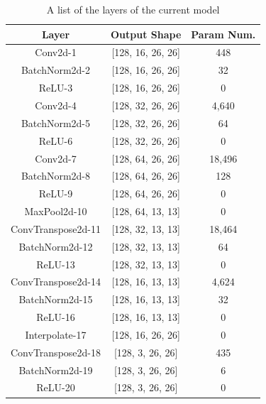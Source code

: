 \documentclass[a4paper, 10]{article}
\begin{document}
            \begin{table}[h!]
                \centering
                \begin{tabular}{|c|c|c|}
                    \hline
                    Layer               &   Output Shape               & Param Num. \\
                    \hline
                    Conv2d-1            &   [128, 16, 26, 26]          & 448 \\
                    BatchNorm2d-2       &   [128, 16, 26, 26]          & 32 \\
                    ReLU-3              &   [128, 16, 26, 26]          & 0 \\
                    Conv2d-4            &   [128, 32, 26, 26]          & 4,640 \\
                    BatchNorm2d-5       &   [128, 32, 26, 26]          &    64 \\
                    ReLU-6              &   [128, 32, 26, 26]          &     0 \\
                    Conv2d-7            &   [128, 64, 26, 26]          &18,496 \\
                    BatchNorm2d-8       &   [128, 64, 26, 26]          &   128 \\
                    ReLU-9              &   [128, 64, 26, 26]          &     0 \\
                    MaxPool2d-10        &   [128, 64, 13, 13]          &     0 \\
                    ConvTranspose2d-11  &   [128, 32, 13, 13]          &18,464 \\
                    BatchNorm2d-12      &   [128, 32, 13, 13]          &    64 \\
                    ReLU-13             &   [128, 32, 13, 13]          &     0 \\
                    ConvTranspose2d-14  &   [128, 16, 13, 13]          & 4,624 \\
                    BatchNorm2d-15      &   [128, 16, 13, 13]          &    32 \\
                    ReLU-16             &   [128, 16, 13, 13]          & 0     \\
                    Interpolate-17      &   [128, 16, 26, 26]          & 0     \\
                    ConvTranspose2d-18  &   [128, 3, 26, 26]           & 435   \\
                    BatchNorm2d-19      &   [128, 3, 26, 26]           & 6     \\
                    ReLU-20             &   [128, 3, 26, 26]           & 0    \\
                    \hline
                \end{tabular}
                \caption{A list of the layers of the current model}
                \label{table:1}
            \end{table}
\end{document}
